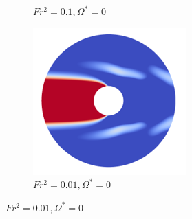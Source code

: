 \begin{figure}
\begin{subfigure}[b]{0.25\textwidth}
        \caption{$Fr^2 = 0.1, \Omega^{\ast} = 0$}
        \label{fig:ps0fs0p1}
    \end{subfigure}
    \hfill
    \begin{subfigure}[b]{0.25\textwidth}
        \centering
        \includegraphics[width=\textwidth]{images/circle/ps0fs0p01.png}
        \caption{$Fr^2 = 0.01, \Omega^{\ast} = 0$}
        \label{fig:ps0fs0p01}
    \end{subfigure}


\end{figure}
